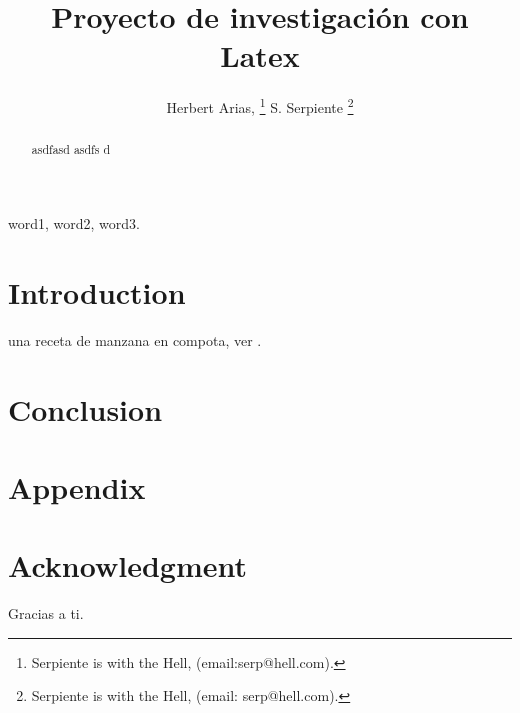 \documentclass[a4paper, 12pt, conference]{ieeeconf}
\title{Proyecto de investigación con Latex}
\author{Herbert Arias, \thanks{Serpiente is with the Hell, (email:serp@hell.com).}
S. Serpiente \thanks{Serpiente is with the Hell, (email: serp@hell.com).}}
\begin{document}
\maketitle

\begin{abstract}
   asdfasd asdfs d
\end{abstract}

\begin{keywords}
   word1, word2, word3.
\end{keywords}

\section{Introduction}
 una receta de manzana en compota, ver \cite{Eva2012}.

\section{Conclusion}
\lipsum[3]

\section*{Appendix}
\lipsum[4]

\section*{Acknowledgment}
Gracias a ti.



\end{document}
